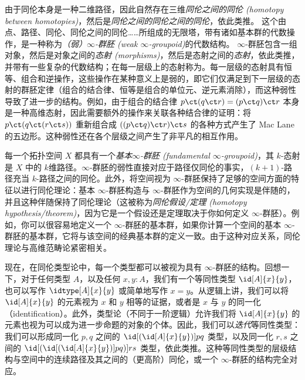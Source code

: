 由于同伦本身是一种二维路径，因此自然存在三维\emph{同伦之间的同伦 (homotopy between homotopies)}，然后是\emph{同伦之间的同伦之间的同伦}，依此类推。
这个由点、路径、同伦、同伦之间的同伦……所组成的无限塔，带有诸如基本群的代数操作，是一种称为\emph{（弱）$\infty$-群胚 (weak $\infty$-groupoid)}的代数结构。 $\infty$-群胚包含一组对象，然后是对象之间的\emph{态射 (morphisms)}，然后是态射之间的\emph{态射}，依此类推，并带有一些复杂的代数结构；在每一层级上的态射称为。每一层级的态射具有恒等、组合和逆操作，这些操作在某种意义上是弱的，即它们仅满足到下一层级的态射的群胚定律（组合的结合律、恒等是组合的单位元、逆元素消除），而这种弱性导致了进一步的结构。例如，由于组合的结合律 $p \ct (q \ct r) = (p \ct q) \ct r$ 本身是一种高维态射，因此需要额外的操作来关联各种结合律的证明：将 $p \ct (q \ct (r \ct s))$ 重新组合成 $((p \ct q) \ct r) \ct s$ 的各种方式产生了 Mac Lane 的五边形。这种弱性还在各个层级之间产生了非平凡的相互作用。

每一个拓扑空间 $X$ 都具有一个\emph{基本$\infty$-群胚 (fundamental $\infty$-groupoid)}，其 $k$-态射是 $X$ 中的 $k$维路径。$\infty$-群胚的弱性直接对应于路径仅同伦的事实，$(k+1)$-路径充当 $k$-路径之间的同伦。此外，将空间视为 $\infty$-群胚保持了足够的空间方面的特征以进行同伦理论：基本 $\infty$-群胚构造与 $\infty$-群胚作为空间的几何实现是伴随的，并且这种伴随保持了同伦理论（这被称为\emph{同伦假设/定理 (homotopy hypothesis/theorem)}，因为它是一个假设还是定理取决于你如何定义 $\infty$-群胚）。例如，你可以很容易地定义一个 $\infty$-群胚的基本群，如果你计算一个空间的基本 $\infty$-群胚的基本群，它将与该空间的经典基本群的定义一致。由于这种对应关系，同伦理论与高维范畴论紧密相关。

%
%

\mentalpause

现在，在同伦类型论中，每一个类型都可以被视为具有 $\infty$-群胚的结构。回想一下，对于任何类型 $A$，以及任何 $x,y:A$，我们有一个等同性类型 $\id[A]{x}{y}$，也可以写作 $\idtype[A]{x}{y}$ 或简单地写作 $x=y$。从逻辑上讲，我们可以将 $\id[A]{x}{y}$ 的元素视为 $x$ 和 $y$ 相等的证据，或者是 $x$ 与 $y$ 的同一化（identification）。此外，类型论（不同于一阶逻辑）允许我们将 $\id[A]{x}{y}$ 的元素也视为可以成为进一步命题的对象的个体。因此，我们可以\emph{迭代}等同性类型：我们可以形成同一化 $p,q$ 之间的 $\id[{(\id[A]{x}{y})}]{p}{q}$ 类型，以及同一化 $r,s$ 之间的 $\id[{(\id[{(\id[A]{x}{y})}]{p}{q})}]{r}{s}$ 类型，依此类推。这种等同性类型的层级结构与空间中的连续路径及其之间的（更高阶）同伦，或一个 $\infty$-群胚的结构完全对应。

